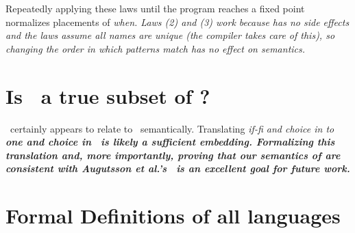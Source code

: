 \documentclass[manuscript,screen,review, 12pt, nonacm]{acmart}
\begin{document}
    Repeatedly applying these laws until the program reaches a fixed point
    normalizes placements of \it{when}. Laws (2) and (3) work because \PPlus
    has no side effects and the laws assume all names are unique (the compiler
    takes care of this), so changing the order in which patterns match has no
    effect on semantics.         

\section{Is \VMinus\ a true subset of \VC?}
\VMinus\ certainly appears to relate to \VC\ semantically. Translating
\it{if-fi} and choice in \VMinus to \bf{one} and choice in \VC\ is likely a
sufficient embedding. Formalizing this translation and, more importantly,
proving that our semantics of \VMinus are consistent with Augutsson et al.'s
\VC\ is an excellent goal for future work. 

\section{Formal Definitions of all languages}
\label{languagedefs}

\utable
\ppsemantics
\vmsemantics

\end{document}
